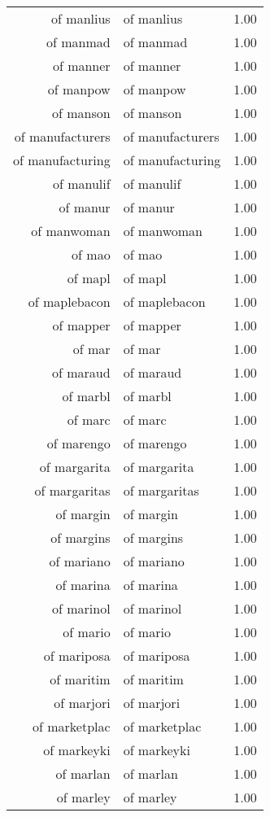 \begin{table}[ht]
\begin{tabular}{rlr}
  of manlius & of manlius & 1.00 \\ 
  of manmad & of manmad & 1.00 \\ 
  of manner & of manner & 1.00 \\ 
  of manpow & of manpow & 1.00 \\ 
  of manson & of manson & 1.00 \\ 
  of manufacturers & of manufacturers & 1.00 \\ 
  of manufacturing & of manufacturing & 1.00 \\ 
  of manulif & of manulif & 1.00 \\ 
  of manur & of manur & 1.00 \\ 
  of manwoman & of manwoman & 1.00 \\ 
  of mao & of mao & 1.00 \\ 
  of mapl & of mapl & 1.00 \\ 
  of maplebacon & of maplebacon & 1.00 \\ 
  of mapper & of mapper & 1.00 \\ 
  of mar & of mar & 1.00 \\ 
  of maraud & of maraud & 1.00 \\ 
  of marbl & of marbl & 1.00 \\ 
  of marc & of marc & 1.00 \\ 
  of marengo & of marengo & 1.00 \\ 
  of margarita & of margarita & 1.00 \\ 
  of margaritas & of margaritas & 1.00 \\ 
  of margin & of margin & 1.00 \\ 
  of margins & of margins & 1.00 \\ 
  of mariano & of mariano & 1.00 \\ 
  of marina & of marina & 1.00 \\ 
  of marinol & of marinol & 1.00 \\ 
  of mario & of mario & 1.00 \\ 
  of mariposa & of mariposa & 1.00 \\ 
  of maritim & of maritim & 1.00 \\ 
  of marjori & of marjori & 1.00 \\ 
  of marketplac & of marketplac & 1.00 \\ 
  of markeyki & of markeyki & 1.00 \\ 
  of marlan & of marlan & 1.00 \\ 
  of marley & of marley & 1.00 \\ 

\end{tabular}
\end{table}
